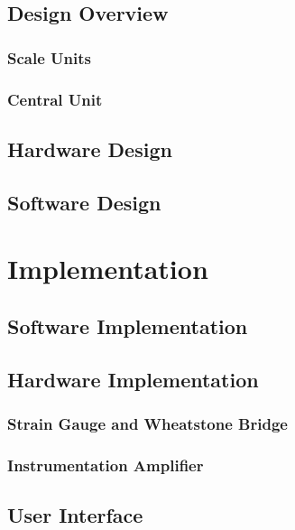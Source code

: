 \documentclass{l3proj}
\begin{document}
\section{Design Overview}

\subsection{Scale Units}
\label{scale}

\subsection{Central Unit}
\label{central}


\label{Block Diagram}
\section{Hardware Design}


\section{Software Design}

\chapter{Implementation}
\label{impl}
\section{Software Implementation}

\section{Hardware Implementation}

\subsection{Strain Gauge and Wheatstone Bridge}

\subsection{Instrumentation Amplifier}
\label{ina}


\section{User Interface}
\end{document}
